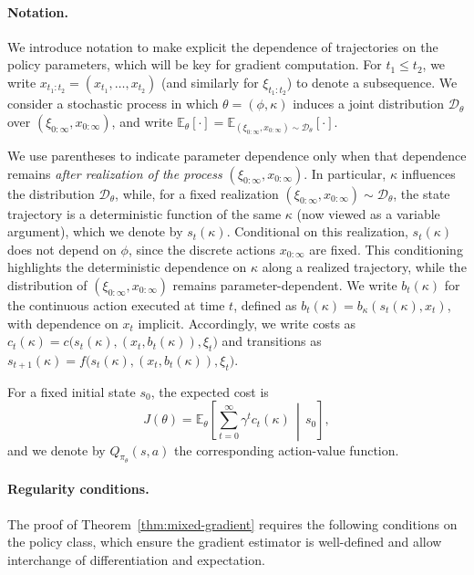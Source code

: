 \documentclass{article}
\theoremstyle{definition}
\theoremstyle{remark}
\begin{document}
\paragraph{Notation.}
We introduce notation to make explicit the dependence of trajectories on the policy parameters, which will be key for gradient computation. For $t_1 \le t_2$, we write $x_{t_1:t_2} = (x_{t_1}, \ldots, x_{t_2})$ (and similarly for $\xi_{t_1:t_2}$) to denote a subsequence. We consider a stochastic process in which $\theta = (\phi, \kappa)$ induces a joint distribution $\mathcal{D}_{\theta}$ over $(\xi_{0:\infty}, x_{0:\infty})$, and write $\mathbb{E}_\theta[\cdot] = \mathbb{E}_{(\xi_{0:\infty}, x_{0:\infty}) \sim \mathcal{D}_{\theta}}[\cdot]$.

We use parentheses to indicate parameter dependence only when that dependence remains \emph{after realization of the process $(\xi_{0:\infty}, x_{0:\infty})$}. In particular, $\kappa$ influences the distribution $\mathcal{D}_{\theta}$, while, for a fixed realization $(\xi_{0:\infty}, x_{0:\infty}) \sim \mathcal{D}_\theta$, the state trajectory is a deterministic function of the same $\kappa$ (now viewed as a variable argument), which we denote by $s_t(\kappa)$. Conditional on this realization, $s_t(\kappa)$ does not depend on $\phi$, since the discrete actions $x_{0:\infty}$ are fixed. This conditioning highlights the deterministic dependence on $\kappa$ along a realized trajectory, while the distribution of $(\xi_{0:\infty}, x_{0:\infty})$ remains parameter-dependent. We write $b_t(\kappa)$ for the continuous action executed at time $t$, defined as $b_t(\kappa) = b_\kappa(s_t(\kappa), x_t)$, with dependence on $x_t$ implicit. Accordingly, we write costs as $c_t(\kappa) = c\bigl(s_t(\kappa),(x_t,b_t(\kappa)),\xi_t\bigr)$ and transitions as $s_{t+1}(\kappa) = f\bigl(s_t(\kappa),(x_t,b_t(\kappa)),\xi_t\bigr)$.

For a fixed initial state $s_0$, the expected cost is
\begin{equation}
J(\theta) = \mathbb{E}_\theta\!\left[\sum_{t=0}^{\infty}\gamma^t 
c_t(\kappa)\,\middle|\, s_0\right],
\end{equation}
and we denote by $Q_{\pi_\theta}(s,a)$ the corresponding action-value 
function.

\paragraph{Regularity conditions.}
The proof of Theorem~\ref{thm:mixed-gradient} requires the following 
conditions on the policy class, which ensure the gradient estimator is 
well-defined and allow interchange of differentiation and expectation.
\end{document}
